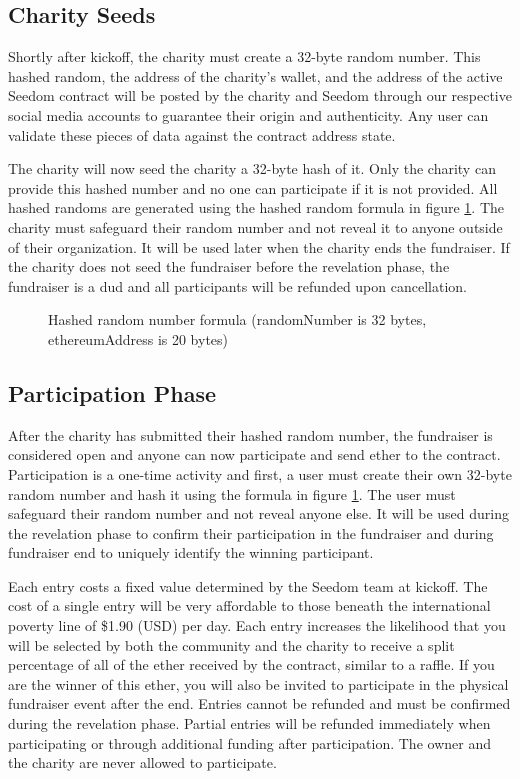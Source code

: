 \documentclass[11pt]{article}
\begin{document}
\subsection{Charity Seeds}
Shortly after kickoff, the charity must create a 32-byte random number. This hashed random, the address of the charity's wallet, and the address of the active Seedom contract will be posted by the charity and Seedom through our respective social media accounts to guarantee their origin and authenticity. Any user can validate these pieces of data against the contract address state.

The charity will now seed the charity a 32-byte hash of it. Only the charity can provide this hashed number and no one can participate if it is not provided. All hashed randoms are generated using the hashed random formula in figure \ref{figure:hashedRandomNumberFormula}. The charity must safeguard their random number and not reveal it to anyone outside of their organization. It will be used later when the charity ends the fundraiser. If the charity does not seed the fundraiser before the revelation phase, the fundraiser is a dud and all participants will be refunded upon cancellation.

\begin{figure}[H]
\begin{center}
\caption{Hashed random number formula (randomNumber is 32 bytes, ethereumAddress is 20 bytes)}
\label{figure:hashedRandomNumberFormula}
\end{center}
\end{figure}

\subsection{Participation Phase}

After the charity has submitted their hashed random number, the fundraiser is considered open and anyone can now participate and send ether to the contract. Participation is a one-time activity and first, a user must create their own 32-byte random number and hash it using the formula in figure \ref{figure:hashedRandomNumberFormula}. The user must safeguard their random number and not reveal anyone else. It will be used during the revelation phase to confirm their participation in the fundraiser and during fundraiser end to uniquely identify the winning participant.

Each entry costs a fixed value determined by the Seedom team at kickoff. The cost of a single entry will be very affordable to those beneath the international poverty line of \$1.90 (USD) per day\cite{1}. Each entry increases the likelihood that you will be selected by both the community and the charity to receive a split percentage of all of the ether received by the contract, similar to a raffle. If you are the winner of this ether, you will also be invited to participate in the physical fundraiser event after the end. Entries cannot be refunded and must be confirmed during the revelation phase. Partial entries will be refunded immediately when participating or through additional funding after participation. The owner and the charity are never allowed to participate.
\end{document}

